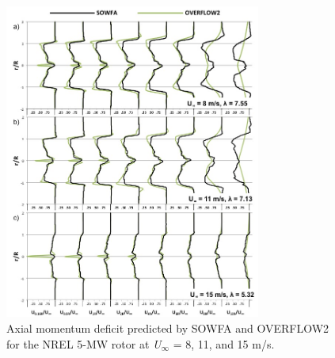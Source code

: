 \begin{figure}[htbp]
 \centering
 \includegraphics[width=0.75\textwidth]{Figures/ch5Figures/VelDef_SowfaOverflow}
 \caption{ Axial momentum deficit predicted by SOWFA and OVERFLOW2 for the NREL 5-MW rotor at \emph{U$_\infty$} = 8, 11, and 15 m/s.}
 \label{fig5-5}
\end{figure}    






